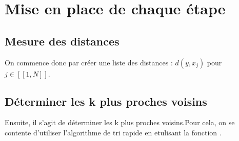 \documentclass[letterpaper,10pt,english]{jupyterBook}
\begin{document}
\section{Mise en place de chaque étape}
\label{\detokenize{notebooks/Machine-Learning/KNN-Cours:mise-en-place-de-chaque-etape}}

\subsection{Mesure des distances}
\label{\detokenize{notebooks/Machine-Learning/KNN-Cours:mesure-des-distances}}
\sphinxAtStartPar
On commence donc par créer une liste des distances : \(d(y, x_j )\) pour \(j \in [[1, N]]\).
\begin{sphinxVerbatimInput}

\begin{sphinxVerbatim}[commandchars=\\\{\}]
   
     \PYG{p}{[}    \PYG{p}{]}
    
\end{sphinxVerbatim}
\end{sphinxVerbatimInput}


\subsection{Déterminer les k plus proches voisins}
\label{\detokenize{notebooks/Machine-Learning/KNN-Cours:determiner-les-k-plus-proches-voisins}}
\sphinxAtStartPar
Ensuite, il s’agit de déterminer les k plus proches voisins.Pour cela, on se contente d’utiliser l’algorithme de tri rapide en etulisant la fonction .
\end{document}
